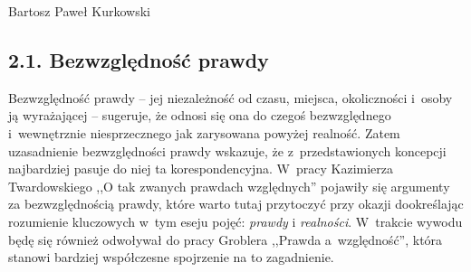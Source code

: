 \begin{artplenv}{Bartosz Paweł Kurkowski}
\subsection{2.1. Bezwzględność prawdy}

Bezwzględność prawdy -- jej niezależność od czasu, miejsca, okoliczności i~osoby ją wyrażającej -- sugeruje, że odnosi się
ona do czegoś bezwzględnego i~wewnętrznie niesprzecznego jak zarysowana powyżej realność. Zatem uzasadnienie
bezwzględności prawdy wskazuje, że z~przedstawionych koncepcji najbardziej pasuje do niej ta korespondencyjna. W~pracy
Kazimierza Twardowskiego
\parencite*{twardowski_o_1900}
,,O tak zwanych prawdach względnych'' pojawiły się argumenty za
bezwzględnością prawdy, które warto tutaj przytoczyć przy okazji dookreślając rozumienie kluczowych w~tym eseju pojęć:
\textit{prawdy }i \textit{realności}. W~trakcie wywodu będę się również odwoływał do pracy Groblera 
\parencite*{grobler_prawda_2000}
,,Prawda a~względność'', która stanowi bardziej współczesne spojrzenie na to
zagadnienie.



\end{artplenv}
